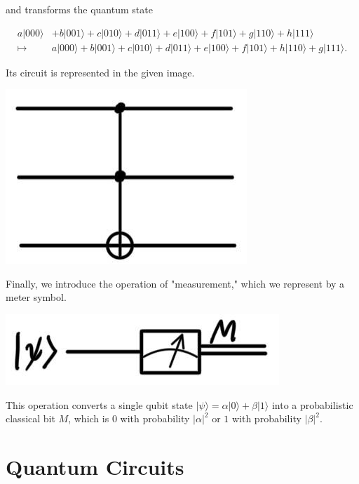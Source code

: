\documentclass{article}
\theoremstyle{definition}
\begin{document}
\begin{enumerate}
        and transforms the quantum state

          \begin{align*}
            a|000\rangle & + b|001\rangle + c|010\rangle + d |011\rangle + e|100\rangle + f |101\rangle + g|110\rangle + h|111\rangle \\
            \mapsto & a|000\rangle + b|001\rangle + c|010\rangle + d |011\rangle + e|100\rangle + f |101\rangle + h|110\rangle + g|111\rangle.
          \end{align*}

          Its circuit is represented in the given image.

          \begin{center}
            \includegraphics[scale=0.3]{img/Toffoli_gate.jpg}
          \end{center}
      \end{enumerate}

      Finally, we introduce the operation of "measurement," which we represent by a meter symbol.

      \begin{center}
        \includegraphics[scale=0.3]{img/Measurement_gate.jpg}
      \end{center}

      This operation converts a single qubit state $| \psi \rangle = \alpha |0\rangle + \beta |1\rangle$ into a probabilistic classical bit $M$, which is $0$ with probability $|\alpha|^2$ or $1$ with probability $|\beta|^2$. 

\section{Quantum Circuits}
\end{document}
